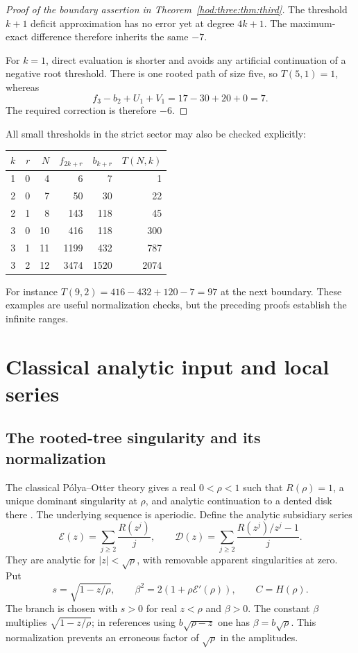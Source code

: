 \documentclass[11pt,letterpaper]{article}
\theoremstyle{definition}\newtheorem{definition}[theorem]{Definition}
\theoremstyle{remark}\newtheorem{remark}[theorem]{Remark}
\newcommand{\Dcal}{\mathcal D}
\newcommand{\Ecal}{\mathcal E}
\begin{document}
\begin{proof}[Proof of the boundary assertion in Theorem~\ref{hod:three:thm:third}]
The threshold $k+1$ deficit approximation has no error yet at degree $4k+1$. The maximum-exact difference therefore inherits the same $-7$.

For $k=1$, direct evaluation is shorter and avoids any artificial continuation of a negative root threshold. There is one rooted path of size five, so $T(5,1)=1$, whereas
\[
f_3-b_2+U_1+V_1=17-30+20+0=7.
\]
The required correction is therefore $-6$.
\end{proof}

All small thresholds in the strict sector may also be checked explicitly:
\begin{center}
\begin{tabular}{rrrrrr}
\toprule
$k$ & $r$ & $N$ & $f_{2k+r}$ & $b_{k+r}$ & $T(N,k)$\\
\midrule
1&0&4&6&7&1\\
2&0&7&50&30&22\\
2&1&8&143&118&45\\
3&0&10&416&118&300\\
3&1&11&1199&432&787\\
3&2&12&3474&1520&2074\\
\bottomrule
\end{tabular}
\end{center}
For instance $T(9,2)=416-432+120-7=97$ at the next boundary. These examples are useful normalization checks, but the preceding proofs establish the infinite ranges.

\section{Classical analytic input and local series}\label{hod:three:sec:analytic}
\subsection{The rooted-tree singularity and its normalization}
The classical P\'olya--Otter theory gives a real $0<\rho<1$ such that $R(\rho)=1$, a unique dominant singularity at $\rho$, and analytic continuation to a dented disk there \cite{otter,fs}. The underlying sequence is aperiodic. Define the analytic subsidiary series
\begin{equation}\label{hod:three:eq:tails}
\Ecal(z)=\sum_{j\ge2}\frac{R(z^j)}j,\qquad
\Dcal(z)=\sum_{j\ge2}\frac{R(z^j)/z^j-1}{j}.
\end{equation}
They are analytic for $|z|<\sqrt\rho$, with removable apparent singularities at zero. Put
\begin{equation}\label{hod:three:eq:critical}
s=\sqrt{1-z/\rho},\qquad
\beta^2=2(1+\rho\Ecal'(\rho)),\qquad C=H(\rho).
\end{equation}
The branch is chosen with $s>0$ for real $z<\rho$ and $\beta>0$. The constant $\beta$ multiplies $\sqrt{1-z/\rho}$; in references using $b\sqrt{\rho-z}$ one has $\beta=b\sqrt\rho$. This normalization prevents an erroneous factor of $\sqrt\rho$ in the amplitudes.
\end{document}
